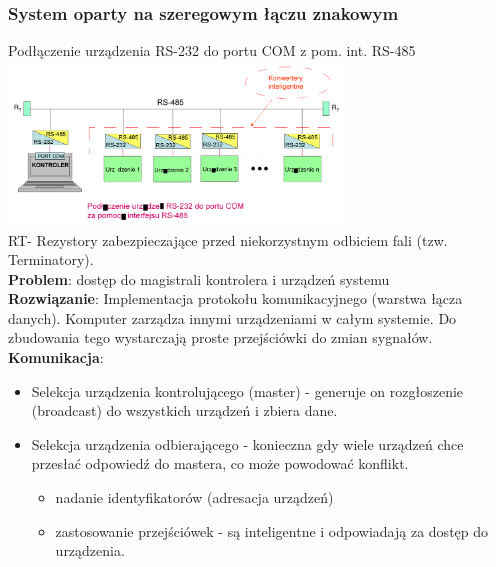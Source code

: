 		\subsubsection{System oparty na szeregowym łączu znakowym}
		Podłączenie urządzenia RS-232 do portu COM z pom. int. RS-485\\
		\includegraphics[width=9cm]{./wyklady/RS232_14_1.pdf}\\
		R\tiny T\normalsize - Rezystory zabezpieczające przed niekorzystnym odbiciem fali (tzw. Terminatory).\\
		\textbf{Problem}: dostęp do magistrali kontrolera i urządzeń systemu\\
		\textbf{Rozwiązanie}: Implementacja protokołu komunikacyjnego (warstwa łącza danych). Komputer zarządza innymi urządzeniami w całym systemie. Do zbudowania tego wystarczają proste przejściówki do zmian sygnałów.\\
		\textbf{Komunikacja}:
		\begin{itemize}
			\item Selekcja urządzenia kontrolującego (master) - generuje on rozgłoszenie (broadcast) do wszystkich urządzeń i zbiera dane.
			\item Selekcja urządzenia odbierającego - konieczna gdy wiele urządzeń chce przesłać odpowiedź do mastera, co może powodować konflikt.
			\begin{itemize}
				\item nadanie identyfikatorów (adresacja urządzeń)
				\item zastosowanie przejściówek - są inteligentne i odpowiadają za dostęp do urządzenia.
			\end{itemize}
		\end{itemize}
